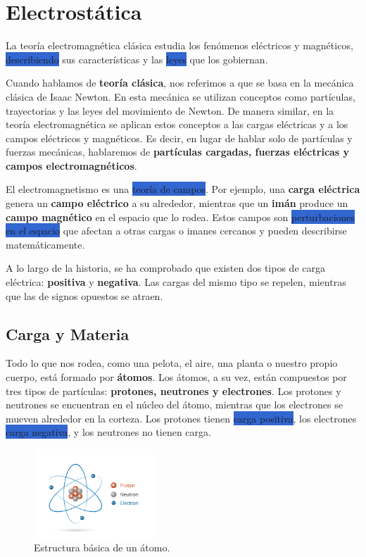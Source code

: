 \section{Electrostática}

La teoría electromagnética clásica estudia los fenómenos eléctricos y magnéticos, \colorbox{highlight}{describiendo} sus características y las \colorbox{highlight}{leyes} que los gobiernan.  

Cuando hablamos de \textbf{teoría clásica}, nos referimos a que se basa en la mecánica clásica de Isaac Newton. En esta mecánica se utilizan conceptos como partículas, trayectorias y las leyes del movimiento de Newton. De manera similar, en la teoría electromagnética se aplican estos conceptos a las cargas eléctricas y a los campos eléctricos y magnéticos. Es decir, en lugar de hablar solo de partículas y fuerzas mecánicas, hablaremos de \textbf{partículas cargadas, fuerzas eléctricas y campos electromagnéticos}.  

El electromagnetismo es una \colorbox{highlight}{teoría de campos}. Por ejemplo, una \textbf{carga eléctrica} genera un \textbf{campo eléctrico} a su alrededor, mientras que un \textbf{imán} produce un \textbf{campo magnético} en el espacio que lo rodea. Estos campos son \colorbox{highlight}{perturbaciones en el espacio} que afectan a otras cargas o imanes cercanos y pueden describirse matemáticamente.  

A lo largo de la historia, se ha comprobado que existen dos tipos de carga eléctrica: \textbf{positiva} y \textbf{negativa}. Las cargas del mismo tipo se repelen, mientras que las de signos opuestos se atraen.  

\subsection{Carga y Materia}

Todo lo que nos rodea, como una pelota, el aire, una planta o nuestro propio cuerpo, está formado por \textbf{átomos}. Los átomos, a su vez, están compuestos por tres tipos de partículas: \textbf{protones, neutrones y electrones}. Los protones y neutrones se encuentran en el núcleo del átomo, mientras que los electrones se mueven alrededor en la corteza. Los protones tienen \colorbox{highlight}{carga positiva}, los electrones \colorbox{highlight}{carga negativa}, y los neutrones no tienen carga. 

\begin{figure}[ht]
    \centering
    \includegraphics[width=0.4\textwidth]{images/atom_struct.jpg}
    \caption{Estructura básica de un átomo.}
    \label{fig:atom_struct}
\end{figure}

